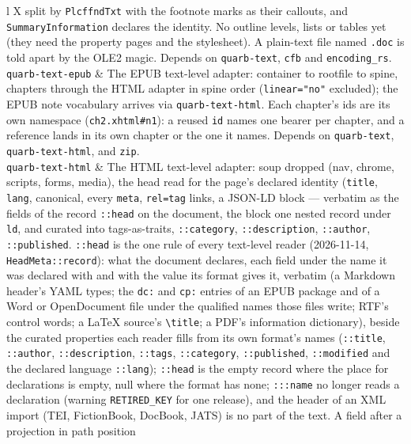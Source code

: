 \documentclass{report}
\begin{document}
\begin{xltabular}{\textwidth}{l X}
  split by \texttt{PlcffndTxt} with the footnote marks as their
  callouts, and \texttt{SummaryInformation} declares the identity.
  No outline levels, lists or tables yet (they need the property
  pages and the stylesheet). A plain-text file named
  \texttt{.doc} is told apart by the OLE2 magic. Depends on
  \texttt{quarb-text}, \texttt{cfb} and \texttt{encoding\_rs}. \\
\texttt{quarb-text-epub} & The EPUB text-level adapter: container to
  rootfile to spine, chapters through the HTML adapter in spine
  order (\texttt{linear="no"} excluded); the EPUB note vocabulary
  arrives via \texttt{quarb-text-html}. Each chapter's ids are
  its own namespace (\texttt{ch2.xhtml\#n1}): a reused
  \texttt{id} names one bearer per chapter, and a reference lands
  in its own chapter or the one it names. Depends on
  \texttt{quarb-text}, \texttt{quarb-text-html}, and
  \texttt{zip}. \\
\texttt{quarb-text-html} & The HTML text-level adapter:
  soup dropped (nav, chrome, scripts, forms, media), the head
  read for the page's declared identity (\texttt{title},
  \texttt{lang}, canonical, every \texttt{meta}, \texttt{rel=tag}
  links, a JSON-LD block — verbatim as the fields of the record
  \texttt{::head} on the document, the block one nested record
  under \texttt{ld}, and curated into tags-as-traits,
  \texttt{::category}, \texttt{::description}, \texttt{::author},
  \texttt{::published}. \texttt{::head} is the one rule of every
  text-level reader (2026-11-14, \texttt{HeadMeta::record}): what
  the document declares, each field under the name it was declared
  with and with the value its format gives it, verbatim (a
  Markdown header's YAML types; the \texttt{dc:} and \texttt{cp:}
  entries of an EPUB package and of a Word or OpenDocument file
  under the qualified names those files write; RTF's control
  words; a \LaTeX{} source's \texttt{\textbackslash title}; a
  PDF's information dictionary), beside the curated properties each
  reader fills from its own format's names (\texttt{::title},
  \texttt{::author}, \texttt{::description}, \texttt{::tags},
  \texttt{::category}, \texttt{::published}, \texttt{::modified}
  and the declared language \texttt{::lang});
  \texttt{::head} is the empty record where the place for declarations is empty, null
  where the format has none; \texttt{:::name} no longer reads a
  declaration (warning \texttt{RETIRED\_KEY} for one release), and
  the header of an XML import (TEI, FictionBook, DocBook, JATS) is
  no part of the text. A field after a projection in path position

\end{xltabular}
\end{document}
